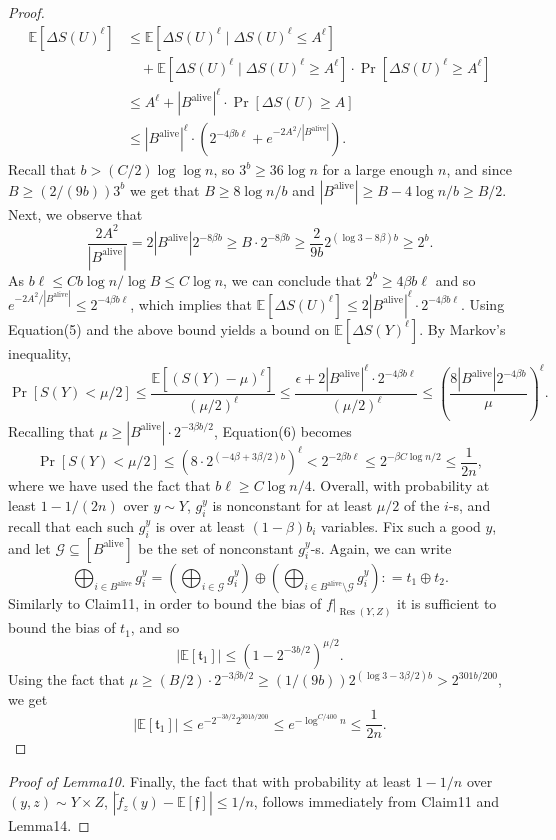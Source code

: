 \begin{proof}
\begin{align*}
\mathbb E[\Delta S(U)^\ell]
&\le\mathbb E[\Delta S(U)^\ell\mid\Delta S(U)^\ell\le A^\ell]\\
&\quad+\mathbb E[\Delta S(U)^\ell\mid\Delta S(U)^\ell\ge A^\ell]\cdot\Pr[\Delta S(U)^\ell\ge A^\ell]\\
&\le A^\ell+|B^{\mathrm{alive}}|^\ell\cdot\Pr[\Delta S(U)\ge A]\\
&\le|B^{\mathrm{alive}}|^\ell\cdot(2^{-4\beta b\ell}+e^{-2A^2/|B^{\mathrm{alive}}|}).
\end{align*}
Recall that $b>(C/2)\log\log n$, so $3^b\ge36\log n$ for a large enough $n$, and since $B\ge(2/(9b))3^b$ we get that $B\ge8\log n/b$ and $|B^{\mathrm{alive}}|\ge B-4\log n/b\ge B/2$. Next, we observe that
\[
\frac{2A^2}{|B^{\mathrm{alive}}|}=2|B^{\mathrm{alive}}|2^{-8\beta b}
\ge B\cdot2^{-8\beta b}
\ge\frac2{9b}2^{(\log3-8\beta)b}\ge2^b.
\]
As $b\ell\le Cb\log n/\log B\le C\log n$, we can conclude that $2^b\ge4\beta b\ell$ and so $e^{-2A^2/|B^{\mathrm{alive}}|}\le2^{-4\beta b\ell}$, which implies that $\mathbb E[\Delta S(U)^\ell]\le2|B^{\mathrm{alive}}|^\ell\cdot2^{-4\beta b\ell}$.
Using Equation(5) and the above bound yields a bound on $\mathbb E[\Delta S(Y)^\ell]$. By Markov's inequality,
\begin{equation}
\Pr[S(Y)<\mu/2]\le\frac{\mathbb E[(S(Y)-\mu)^\ell]}{(\mu/2)^\ell}
\le\frac{\epsilon+2|B^{\mathrm{alive}}|^\ell\cdot2^{-4\beta b\ell}}{(\mu/2)^\ell}
\le\left(\frac{8|B^{\mathrm{alive}}|2^{-4\beta b}}{\mu}\right)^\ell.\tag{6}
\end{equation}
Recalling that $\mu\ge|B^{\mathrm{alive}}|\cdot2^{-3\beta b/2}$, Equation(6) becomes
\[
\Pr[S(Y)<\mu/2]\le(8\cdot2^{(-4\beta+3\beta/2)b})^\ell
<2^{-2\beta b\ell}\le2^{-\beta C\log n/2}\le\frac1{2n},
\]
where we have used the fact that $b\ell\ge C\log n/4$.
Overall, with probability at least $1-1/(2n)$ over $y\sim Y$, $g_i^y$ is nonconstant for at least $\mu/2$ of the $i$-s, and recall that each such $g_i^y$ is over at least $(1-\beta)b_i$ variables. Fix such a good $y$, and let $\mathcal G\subseteq[B^{\mathrm{alive}}]$ be the set of nonconstant $g_i^y$-s. Again, we can write
\[
\bigoplus_{i\in B^{\mathrm{alive}}}g_i^y
=\left(\bigoplus_{i\in\mathcal G}g_i^y\right)\oplus\left(\bigoplus_{i\in B^{\mathrm{alive}}\setminus\mathcal G}g_i^y\right)
\mathrel{\mathop:}=t_1\oplus t_2.
\]
Similarly to Claim11, in order to bound the bias of $f|_{\operatorname{Res}(Y,Z)}$ it is sufficient to bound the bias of $t_1$, and so
\[
|\mathbb E[\mathfrak t_1]|\le(1-2^{-3b/2})^{\mu/2}.
\]
Using the fact that $\mu\ge(B/2)\cdot2^{-3\beta b/2}\ge(1/(9b))2^{(\log3-3\beta/2)b}>2^{301b/200}$, we get
\[
|\mathbb E[\mathfrak t_1]|\le e^{-2^{-3b/2}2^{301b/200}}\le e^{-\log^{C/400}n}\le\frac1{2n}.
\]
\end{proof}
\begin{proof}[Proof of Lemma10]
Finally, the fact that with probability at least $1-1/n$ over $(y,z)\sim Y\times Z$, $|\widetilde f_z(y)-\mathbb E[\mathfrak f]|\le1/n$, follows immediately from Claim11 and Lemma14.
\end{proof}
